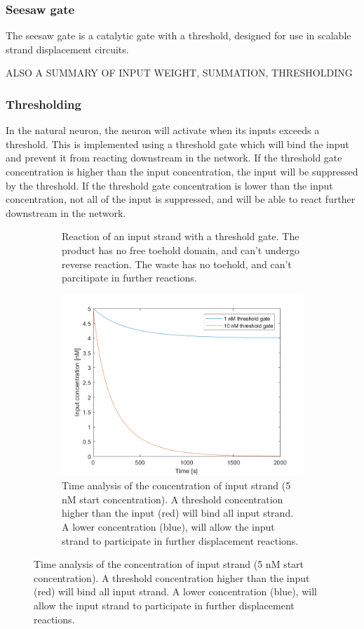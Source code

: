
\subsubsection{Seesaw gate}

The seesaw gate is a catalytic gate with a threshold, designed for use in scalable strand displacement circuits.


ALSO A SUMMARY OF INPUT WEIGHT, SUMMATION, THRESHOLDING

\subsubsection{Thresholding}
In the natural neuron, the neuron will activate when its inputs exceeds a threshold. This is implemented using a threshold gate which will bind the input and prevent it from reacting downstream in the network. If the threshold gate concentration is higher than the input concentration, the input will be suppressed by the threshold. If the threshold gate concentration is lower than the input concentration, not all of the input is suppressed, and will be able to react further downstream in the network.

\begin{figure}[H]
  \begin{subfigure}[t]{.49\columnwidth}
    \centering
{} {

}
\caption{Reaction of an input strand with a threshold gate. The product has no free toehold domain, and can't undergo reverse reaction. The waste has no toehold, and can't parcitipate in further reactions.}
\label{}
\end{subfigure}
\hfill
\begin{subfigure}[t]{.49\columnwidth}
  \centering
\includegraphics[width=\linewidth]{images/thresholding.png}
\caption{Time analysis of the concentration of input strand (5 nM start concentration). A threshold concentration higher than the input (red) will bind all input strand. A lower concentration (blue), will allow the input strand to participate in further displacement reactions.}
\label{}
\end{subfigure}
\end{figure}

